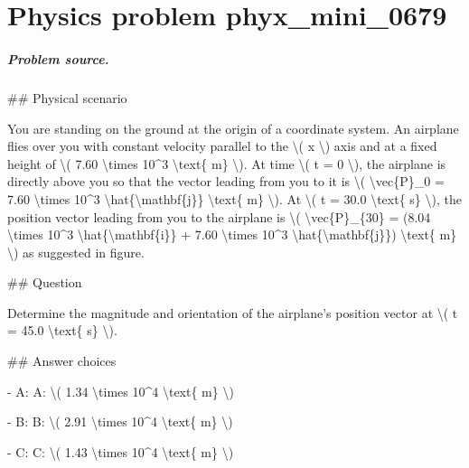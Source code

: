 
\chapter{Physics problem phyx\_mini\_0679}
\label{ch:PhyXMiniProblems_problem_phyx_mini_0679}

\paragraph{Problem source.}
\#\# Physical scenario

You are standing on the ground at the origin of a coordinate system. An airplane flies over you with constant velocity parallel to the \textbackslash{}( x \textbackslash{}) axis and at a fixed height of \textbackslash{}( 7.60 \textbackslash{}times 10\textasciicircum{}3 \textbackslash{}text\{ m\} \textbackslash{}). At time \textbackslash{}( t = 0 \textbackslash{}), the airplane is directly above you so that the vector leading from you to it is \textbackslash{}( \textbackslash{}vec\{P\}\_0 = 7.60 \textbackslash{}times 10\textasciicircum{}3 \textbackslash{}hat\{\textbackslash{}mathbf\{j\}\} \textbackslash{}text\{ m\} \textbackslash{}). At \textbackslash{}( t = 30.0 \textbackslash{}text\{ s\} \textbackslash{}), the position vector leading from you to the airplane is \textbackslash{}( \textbackslash{}vec\{P\}\_\{30\} = (8.04 \textbackslash{}times 10\textasciicircum{}3 \textbackslash{}hat\{\textbackslash{}mathbf\{i\}\} + 7.60 \textbackslash{}times 10\textasciicircum{}3 \textbackslash{}hat\{\textbackslash{}mathbf\{j\}\}) \textbackslash{}text\{ m\} \textbackslash{}) as suggested in figure.

\#\# Question

Determine the magnitude and orientation of the airplane's position vector at \textbackslash{}( t = 45.0 \textbackslash{}text\{ s\} \textbackslash{}).

\#\# Answer choices

- A: A: \textbackslash{}( 1.34 \textbackslash{}times 10\textasciicircum{}4 \textbackslash{}text\{ m\} \textbackslash{})

- B: B: \textbackslash{}( 2.91 \textbackslash{}times 10\textasciicircum{}4 \textbackslash{}text\{ m\} \textbackslash{})

- C: C: \textbackslash{}( 1.43 \textbackslash{}times 10\textasciicircum{}4 \textbackslash{}text\{ m\} \textbackslash{})

